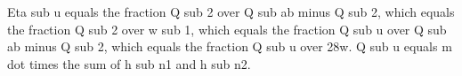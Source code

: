 Eta sub u equals the fraction Q sub 2 over Q sub ab minus Q sub 2, which equals the fraction Q sub 2 over w sub 1, which equals the fraction Q sub u over Q sub ab minus Q sub 2, which equals the fraction Q sub u over 28w. Q sub u equals m dot times the sum of h sub n1 and h sub n2.